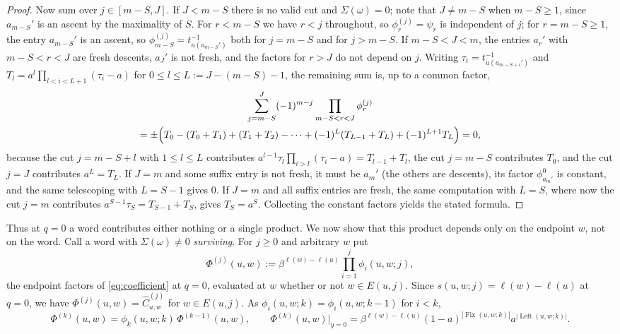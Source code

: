 \documentclass[11pt]{article}
\newcommand{\Fix}{\operatorname{Fix}}
\newcommand{\Left}{\operatorname{Left}}
\newcommand{\ellength}{\ell}
\begin{document}
\begin{proof}
Now sum over $j\in[m-S,J]$. If $J<m-S$ there is no valid cut and
$\Sigma(\omega)=0$; note that $J\neq m-S$ when $m-S\geq1$, since
$a_{m-S}'$ is an ascent by the maximality of $S$. For $r<m-S$ we have
$r<j$ throughout, so
$\phi^{(j)}_r=\psi_r$ is independent of $j$; for $r=m-S\geq1$, the
entry $a_{m-S}'$ is an ascent, so
$\phi^{(j)}_{m-S}=t_{u(a_{m-S}')}^{-1}$ both for $j=m-S$ and for
$j>m-S$. If $m-S<J<m$, the entries $a_r'$ with $m-S<r<J$ are fresh
descents, $a_J'$ is not fresh, and the factors for $r>J$ do not depend
on $j$. Writing $\tau_i=t_{u(a_{m-S+i}')}^{-1}$ and
$T_l=a^{l}\prod_{l<i<L+1}(\tau_i-a)$ for $0\leq l\leq L:=J-(m-S)-1$,
the remaining sum is, up to a common factor,
\begin{multline*}
 \sum_{j=m-S}^{J}(-1)^{m-j}\prod_{m-S<r<J}\phi_r^{(j)}\\
 =\pm\Bigl(T_0-(T_0+T_1)+(T_1+T_2)-\cdots
     +(-1)^{L}(T_{L-1}+T_L)+(-1)^{L+1}T_L\Bigr)=0,
\end{multline*}
because the cut $j=m-S+l$ with $1\leq l\leq L$ contributes
$a^{l-1}\tau_l\prod_{i>l}(\tau_i-a)=T_{l-1}+T_l$, the cut $j=m-S$
contributes $T_0$, and the cut $j=J$ contributes $a^L=T_L$. If $J=m$
and some suffix entry is not fresh, it must be $a_m'$ (the others are
descents), its factor $\phi^0_{a_m'}$ is constant, and the same
telescoping with $L=S-1$ gives $0$. If $J=m$ and all suffix entries
are fresh, the same computation with $L=S$, where now the cut $j=m$
contributes $a^{S-1}\tau_S=T_{S-1}+T_S$, gives $T_S=a^S$. Collecting
the constant factors yields the stated formula.
\end{proof}

Thus at $q=0$ a word contributes either nothing or a single product.
We now show that this product depends only on the endpoint $w$, not
on the word. Call a word with $\Sigma(\omega)\neq0$ \emph{surviving}.
For $j\geq0$ and arbitrary $w$ put
\[
 \Phi^{(j)}(u,w):=\beta^{\ellength(w)-\ellength(u)}
   \prod_{i=1}^{j}\phi_i(u,w;j),
\]
the endpoint factors of \eqref{eq:coefficient} at $q=0$, evaluated at
$w$ whether or not $w\in E(u,j)$. Since
$s(u,w;j)=\ellength(w)-\ellength(u)$ at $q=0$, we have
$\Phi^{(j)}(u,w)=\widehat C^{(j)}_{u,w}$ for $w\in E(u,j)$. As
$\phi_i(u,w;k)=\phi_i(u,w;k-1)$ for $i<k$,
\begin{equation}\label{eq:Phi-step}
 \Phi^{(k)}(u,w)=\phi_k(u,w;k)\,\Phi^{(k-1)}(u,w),
 \qquad
 \Phi^{(k)}(u,w)\big|_{y=0}
 =\beta^{\ellength(w)-\ellength(u)}(1-a)^{|\Fix(u,w;k)|}a^{|\Left(u,w;k)|}.
\end{equation}
\end{document}
